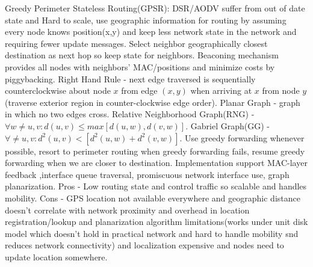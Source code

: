 \documentclass[8pt]{extarticle}
\begin{document}
\begin{multicols}{2}
Greedy Perimeter Stateless Routing(GPSR): DSR/AODV suffer from out of date state and Hard to scale, use geographic information for routing by assuming every node knows position(x,y) and keep less network state in the network and requiring fewer update messages. Select neighbor geographically closest destination as next hop so keep state for neighbors. Beaconing mechanism provides all nodes with neighbors’ MAC/positions and minimize costs by piggybacking. Right Hand Rule - next edge traversed is sequentially counterclockwise about node $x$ from edge $(x,y)$ when arriving at $x$ from node $y$(traverse exterior region in counter-clockwise edge order). Planar Graph - graph in which no two edges cross. Relative Neighborhood Graph(RNG) - $\forall{w\neq{u,v}}: d(u,v)\leq{max[d(u,w),d(v,w)]}$. Gabriel Graph(GG) - $\forall{\neq{u,v}}:d^2(u,v)<[d^2(u,w) + d^2(v,w)]$. Use greedy forwarding whenever possible, resort to perimeter routing when greedy forwarding fails, resume greedy forwarding when we are closer to destination. Implementation support MAC-layer feedback ,interface queue traversal, promiscuous network interface use, graph planarization. Pros - Low routing state and control traffic so scalable and handles mobility. Cons - GPS location not available everywhere and geographic distance doesn't correlate with network proximity and overhead in location registration/lookup and planarization algorithm limitations(works under unit disk model which doesn’t hold in practical network and hard to handle mobility snd reduces network connectivity) and localization expensive and nodes need to update location somewhere.


\end{multicols}
\end{document}
